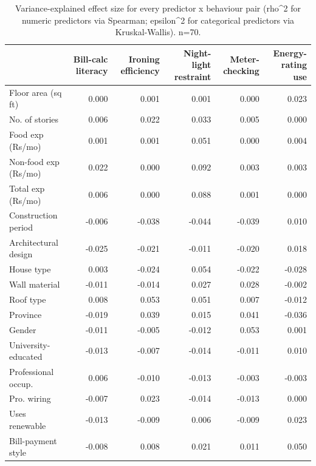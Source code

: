 \begin{table}
\caption{Variance-explained effect size for every predictor x behaviour pair (rho^2 for numeric predictors via Spearman; epsilon^2 for categorical predictors via Kruskal-Wallis). n=70.}
\label{tab:eff_matrix}
\begin{tabular}{lrrrrr}
\toprule
 & Bill-calc literacy & Ironing efficiency & Night-light restraint & Meter-checking & Energy-rating use \\
\midrule
Floor area (sq ft) & 0.000 & 0.001 & 0.001 & 0.000 & 0.023 \\
No. of stories & 0.006 & 0.022 & 0.033 & 0.005 & 0.000 \\
Food exp (Rs/mo) & 0.001 & 0.001 & 0.051 & 0.000 & 0.004 \\
Non-food exp (Rs/mo) & 0.022 & 0.000 & 0.092 & 0.003 & 0.003 \\
Total exp (Rs/mo) & 0.006 & 0.000 & 0.088 & 0.001 & 0.000 \\
Construction period & -0.006 & -0.038 & -0.044 & -0.039 & 0.010 \\
Architectural design & -0.025 & -0.021 & -0.011 & -0.020 & 0.018 \\
House type & 0.003 & -0.024 & 0.054 & -0.022 & -0.028 \\
Wall material & -0.011 & -0.014 & 0.027 & 0.028 & -0.002 \\
Roof type & 0.008 & 0.053 & 0.051 & 0.007 & -0.012 \\
Province & -0.019 & 0.039 & 0.015 & 0.041 & -0.036 \\
Gender & -0.011 & -0.005 & -0.012 & 0.053 & 0.001 \\
University-educated & -0.013 & -0.007 & -0.014 & -0.011 & 0.010 \\
Professional occup. & 0.006 & -0.010 & -0.013 & -0.003 & -0.003 \\
Pro. wiring & -0.007 & 0.023 & -0.014 & -0.013 & 0.000 \\
Uses renewable & -0.013 & -0.009 & 0.006 & -0.009 & 0.023 \\
Bill-payment style & -0.008 & 0.008 & 0.021 & 0.011 & 0.050 \\
\bottomrule
\end{tabular}
\end{table}
